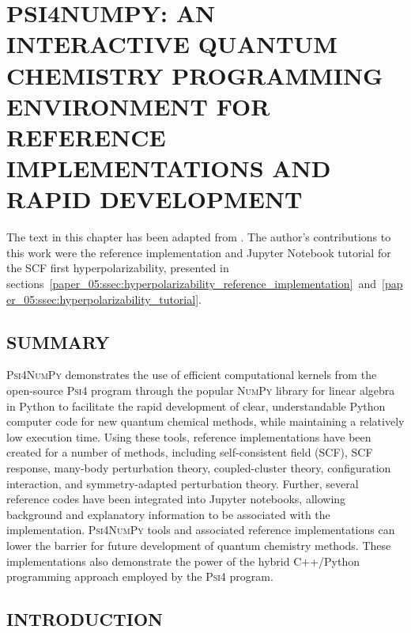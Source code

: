 \documentclass[%
  class = book,%
  crop = false,%
  float = true,%
  multi = true,%
  preview = false,%
]{standalone}
\newcommand{\caps}[1]{\uppercase{#1}}
\begin{document}
\newcommand{\numpy}{\textsc{NumPy}\xspace}
\newcommand{\pfour}{\textsc{Psi4}\xspace}
\newcommand{\pfn}{\textsc{Psi4NumPy}\xspace}
\newcommand{\arrayint}{\texttt{array\_interface}\xspace}
\newcommand{\einsum}{\texttt{einsum}\xspace}

\chapter[\texorpdfstring{\caps{\pfn}}{\pfn}]{\texorpdfstring{\caps{\pfn: An Interactive Quantum Chemistry Programming Environment for Reference Implementations and Rapid Development}}{\pfn: An Interactive Quantum Chemistry Programming Environment for Reference Implementations and Rapid Development}}
\label{ch:paper_05}

The text in this chapter has been adapted from . The author's contributions to this work were the reference implementation and Jupyter Notebook tutorial for the SCF first hyperpolarizability, presented in sections~\ref{paper_05:ssec:hyperpolarizability_reference_implementation}~and~\ref{paper_05:ssec:hyperpolarizability_tutorial}.

\section{\texorpdfstring{\caps{Summary}}{Summary}}

\pfn demonstrates the use of efficient computational kernels from the open-source \pfour program through the popular \numpy library for linear algebra in Python to facilitate the rapid development of clear, understandable Python computer code for new quantum chemical methods, while maintaining a relatively low execution time.  Using these tools, reference implementations have been created for a number of methods, including self-consistent field (SCF), SCF response, many-body perturbation theory, coupled-cluster theory, configuration interaction, and symmetry-adapted perturbation theory.  Further, several reference codes have been integrated into Jupyter notebooks, allowing background and explanatory information to be associated with the implementation.  \pfn tools and associated reference implementations can lower the barrier for future development of quantum chemistry methods.  These implementations also demonstrate the power of the hybrid C++/Python programming approach employed by the \pfour program.

\section{\texorpdfstring{\caps{Introduction}}{Introduction}}
\end{document}
